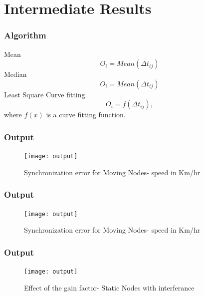 \documentclass[t]{beamer}
\begin{document}
\section{Intermediate Results}

\begin{frame}
\frametitle{Algorithm} Mean \newline
\begin{equation}
O_i = Mean(\Delta t_{ij})
\end{equation}
Median \newline
\begin{equation}
O_i = Mean(\Delta t_{ij})
\end{equation}
Least Square Curve fitting \newline
\begin{equation}
O_i = f(\Delta t_{ij}) ,
\end{equation}
where $f(x)$ is a curve fitting function.
\end{frame}
\begin{frame}
    \frametitle{Output}
    \begin{figure}
    \centering
    \texttt{[image: output]}
    \caption{Synchronization error for Moving Nodes- speed in Km/hr}
    \end{figure}
\end{frame}

\begin{frame}
    \frametitle{Output}
    \begin{figure}
    \centering
    \texttt{[image: output]}
    \caption{Synchronization error for Moving Nodes- speed in Km/hr}
    \end{figure}
\end{frame}


\begin{frame}
    \frametitle{Output}
    \begin{figure}
    \centering
    \texttt{[image: output]}
    \caption{Effect of the gain factor- Static Nodes with interferance}
    \end{figure}
\end{frame}
\end{document}
